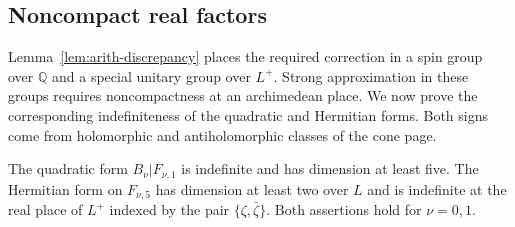\subsection{Noncompact real factors}\label{subsec:arith-real}

Lemma~\ref{lem:arith-discrepancy} places the required correction in a
spin group over $\mathbb Q$ and a special unitary group over $L^+$.
Strong approximation in these groups requires noncompactness at an
archimedean place. We now prove the corresponding indefiniteness of
the quadratic and Hermitian forms. Both signs come from holomorphic
and antiholomorphic classes of the cone page.

\begin{lemma}\label{lem:arith-real-signs}
The quadratic form $B_\nu|F_{\nu,1}$ is indefinite and has dimension at
least five.  The Hermitian form on $F_{\nu,5}$ has dimension at least two
over $L$ and is indefinite at the real place of $L^+$ indexed by
the pair $\{\zeta,\bar\zeta\}$. Both assertions hold for $\nu=0,1$.
\end{lemma}

